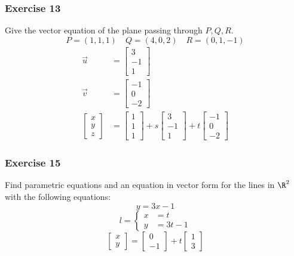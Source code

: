 \documentclass{math}
\begin{document}
\subsubsection*{Exercise 13}
Give the vector equation of the plane passing through \( P, Q, R \).
\[ P = (1,1,1) \quad Q = (4,0,2) \quad R = (0,1,-1) \]
\begin{align*}
  \vec{u} &= \begin{bmatrix}3 \\ -1 \\ 1\end{bmatrix} \\
  \vec{v} &= \begin{bmatrix}-1 \\ 0 \\ -2\end{bmatrix} \\
  \begin{bmatrix}x \\ y \\ z\end{bmatrix} &=
    \begin{bmatrix}1 \\ 1 \\ 1\end{bmatrix}+
    s\begin{bmatrix}3 \\ -1 \\ 1\end{bmatrix}+
    t\begin{bmatrix}-1 \\ 0 \\ -2\end{bmatrix}
\end{align*}

\subsubsection*{Exercise 15}
Find parametric equations and an equation in vector form for the lines in
\( \R^2 \) with the following equations:
\[ y = 3x-1 \]
\[ l = \begin{cases}
  x &= t \\
  y &= 3t-1
\end{cases} \]
\[ \begin{bmatrix}x \\ y\end{bmatrix} = \begin{bmatrix}0 \\ -1\end{bmatrix}+
  t\begin{bmatrix}1 \\ 3\end{bmatrix} \]
\end{document}

